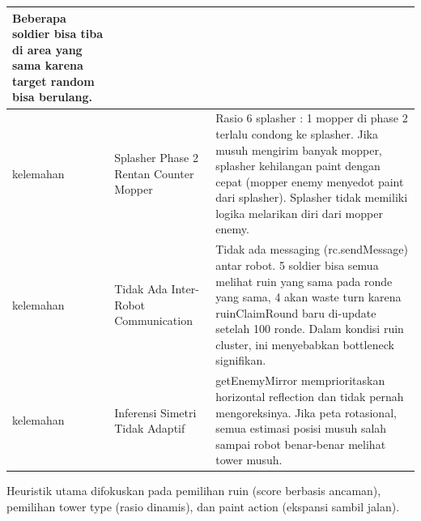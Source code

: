 \documentclass{article}
\begin{document}
\begin{enumerate}[label=\alph*.]
\begin{longtable}{|p{2cm}|p{3.5cm}|p{8.5cm}|}
Beberapa soldier bisa tiba di area yang sama karena target random bisa berulang. \\
\hline
kelemahan
& Splasher Phase 2 Rentan Counter Mopper
& Rasio 6 splasher : 1 mopper di phase 2 terlalu condong ke splasher.
Jika musuh mengirim banyak mopper, splasher kehilangan paint dengan cepat (mopper enemy menyedot paint dari splasher).
Splasher tidak memiliki logika melarikan diri dari mopper enemy. \\
\hline
kelemahan
& Tidak Ada Inter-Robot Communication
& Tidak ada messaging (rc.sendMessage) antar robot.
5 soldier bisa semua melihat ruin yang sama pada ronde yang sama, 4 akan waste turn karena ruinClaimRound baru di-update setelah 100 ronde.
Dalam kondisi ruin cluster, ini menyebabkan bottleneck signifikan. \\
\hline
kelemahan
& Inferensi Simetri Tidak Adaptif
& getEnemyMirror memprioritaskan horizontal reflection dan tidak pernah mengoreksinya.
Jika peta rotasional, semua estimasi posisi musuh salah sampai robot benar-benar melihat tower musuh. \\
\hline
\end{longtable}


Heuristik utama difokuskan pada pemilihan ruin (score berbasis ancaman), pemilihan tower
type (rasio dinamis), dan paint action (ekspansi sambil jalan).


\end{enumerate}
\end{document}
